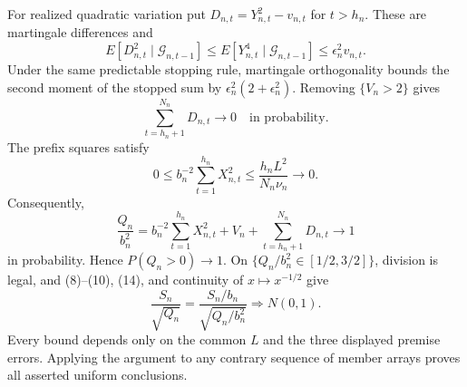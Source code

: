 For realized quadratic variation put \(D_{n,t}=Y_{n,t}^2-v_{n,t}\) for \(t>h_n\).  These are martingale differences and
\[
 E[D_{n,t}^2\mid\mathcal G_{n,t-1}]
 \le E[Y_{n,t}^4\mid\mathcal G_{n,t-1}]
 \le\epsilon_n^2v_{n,t}.
\tag{11}
\]
Under the same predictable stopping rule, martingale orthogonality bounds the second moment of the stopped sum by \(\epsilon_n^2(2+\epsilon_n^2)\).  Removing \(\{V_n>2\}\) gives
\[
 \sum_{t=h_n+1}^{N_n}D_{n,t}\longrightarrow0
 \quad\text{in probability}.
\tag{12}
\]
The prefix squares satisfy
\[
 0\le b_n^{-2}\sum_{t=1}^{h_n}X_{n,t}^2
 \le\frac{h_nL^2}{N_n\nu_n}\longrightarrow0.
\tag{13}
\]
Consequently,
\[
 \frac{Q_n}{b_n^2}
 =b_n^{-2}\sum_{t=1}^{h_n}X_{n,t}^2+V_n
 +\sum_{t=h_n+1}^{N_n}D_{n,t}
 \longrightarrow1
\tag{14}
\]
in probability.  Hence \(P(Q_n>0)\to1\).  On \(\{Q_n/b_n^2\in[1/2,3/2]\}\), division is legal, and (8)--(10), (14), and continuity of \(x\mapsto x^{-1/2}\) give
\[
 \frac{S_n}{\sqrt{Q_n}}
 =\frac{S_n/b_n}{\sqrt{Q_n/b_n^2}}\Rightarrow N(0,1).
\tag{15}
\]
Every bound depends only on the common \(L\) and the three displayed premise errors.  Applying the argument to any contrary sequence of member arrays proves all asserted uniform conclusions.